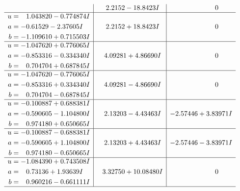 \documentclass[1p]{elsarticle_modified}
\theoremstyle{definition}
\begin{document}
$$\begin{array}{c|c|c}
 & \phantom{-}2.2152 - 18.8423 I & \phantom{-0.000000 } 0 \\ \hline\begin{aligned}
u &= \phantom{-}1.043820 - 0.774874 I \\
a &= -0.61529 - 2.37605 I \\
b &= -1.109610 + 0.715503 I\end{aligned}
 & \phantom{-}2.2152 + 18.8423 I & \phantom{-0.000000 } 0 \\ \hline\begin{aligned}
u &= -1.047620 + 0.776065 I \\
a &= -0.853316 - 0.334340 I \\
b &= \phantom{-}0.704704 + 0.687845 I\end{aligned}
 & \phantom{-}4.09281 + 4.86690 I & \phantom{-0.000000 } 0 \\ \hline\begin{aligned}
u &= -1.047620 - 0.776065 I \\
a &= -0.853316 + 0.334340 I \\
b &= \phantom{-}0.704704 - 0.687845 I\end{aligned}
 & \phantom{-}4.09281 - 4.86690 I & \phantom{-0.000000 } 0 \\ \hline\begin{aligned}
u &= -0.100887 + 0.688381 I \\
a &= -0.590605 - 1.104800 I \\
b &= \phantom{-}0.974180 + 0.650665 I\end{aligned}
 & \phantom{-}2.13203 - 4.43463 I & -2.57446 + 3.83971 I \\ \hline\begin{aligned}
u &= -0.100887 - 0.688381 I \\
a &= -0.590605 + 1.104800 I \\
b &= \phantom{-}0.974180 - 0.650665 I\end{aligned}
 & \phantom{-}2.13203 + 4.43463 I & -2.57446 - 3.83971 I \\ \hline\begin{aligned}
u &= -1.084390 + 0.743508 I \\
a &= \phantom{-}0.73136 + 1.93639 I \\
b &= \phantom{-}0.960216 - 0.661111 I\end{aligned}
 & \phantom{-}3.32750 + 10.08480 I & \phantom{-0.000000 } 0\\
 \hline 
 \end{array}$$\newpage$$\begin{array}{c|c|c}  

\end{array}$$
\end{document}
